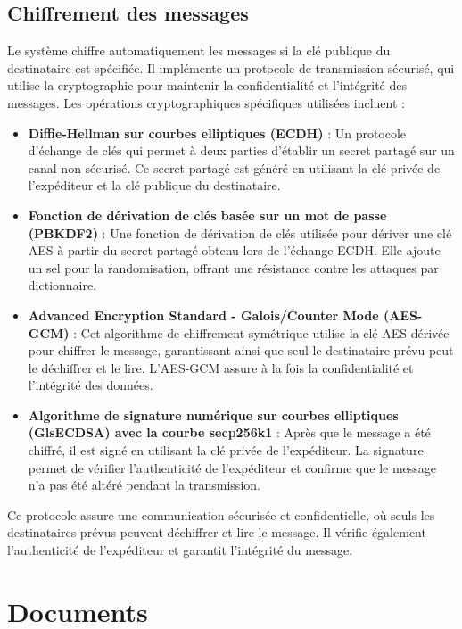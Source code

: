 \subsection{Chiffrement des messages}

Le système chiffre automatiquement les messages si la clé publique du destinataire est spécifiée. Il implémente un protocole de transmission sécurisé, qui utilise la cryptographie pour maintenir la confidentialité et l'intégrité des messages. Les opérations cryptographiques spécifiques utilisées incluent :

\begin{itemize}
    \item \textbf{Diffie-Hellman sur courbes elliptiques (\gls{ECDH})} : Un protocole d'échange de clés qui permet à deux parties d'établir un secret partagé sur un canal non sécurisé. Ce secret partagé est généré en utilisant la clé privée de l'expéditeur et la clé publique du destinataire.
    \item \textbf{Fonction de dérivation de clés basée sur un mot de passe (\gls{PBKDF2})} : Une fonction de dérivation de clés utilisée pour dériver une clé AES à partir du secret partagé obtenu lors de l'échange \gls{ECDH}. Elle ajoute un sel pour la randomisation, offrant une résistance contre les attaques par dictionnaire.
    \item \textbf{Advanced Encryption Standard - Galois/Counter Mode (AES-GCM)} : Cet algorithme de chiffrement symétrique utilise la clé \gls{AES} dérivée pour chiffrer le message, garantissant ainsi que seul le destinataire prévu peut le déchiffrer et le lire. L'AES-GCM assure à la fois la confidentialité et l'intégrité des données.
    \item \textbf{Algorithme de signature numérique sur courbes elliptiques (Gls{ECDSA}) avec la courbe secp256k1} : Après que le message a été chiffré, il est signé en utilisant la clé privée de l'expéditeur. La signature permet de vérifier l'authenticité de l'expéditeur et confirme que le message n'a pas été altéré pendant la transmission.
\end{itemize}

Ce protocole assure une communication sécurisée et confidentielle, où seuls les destinataires prévus peuvent déchiffrer et lire le message.
Il vérifie également l'authenticité de l'expéditeur et garantit l'intégrité du message.

\section{Documents}

